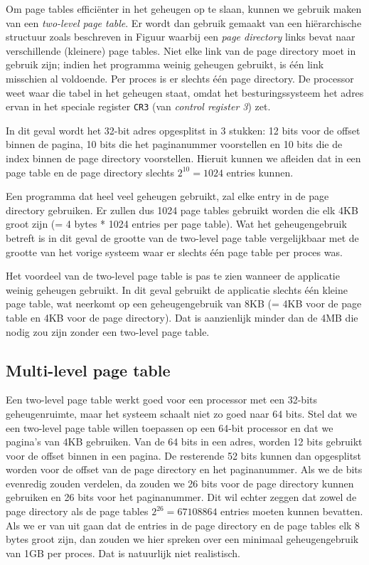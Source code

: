 Om page tables effici\"enter in het geheugen op te slaan, kunnen we gebruik maken van een \emph{two-level page table}. Er wordt dan gebruik gemaakt van een hi\"erarchische structuur zoals beschreven in Figuur  waarbij een \emph{page directory} links bevat naar verschillende (kleinere) page tables. Niet elke link van de page directory moet in gebruik zijn; indien het programma weinig geheugen gebruikt, is \'e\'en link misschien al voldoende. Per proces is er slechts \'e\'en page directory. De processor weet waar die tabel in het geheugen staat, omdat het besturingssysteem het adres ervan in het speciale register \texttt{CR3} (van \emph{control register 3}) zet.

In dit geval wordt het 32-bit adres opgesplitst in 3 stukken: 12 bits voor de offset binnen de pagina, 10 bits die het paginanummer voorstellen en 10 bits die de index binnen de page directory voorstellen. Hieruit kunnen we afleiden dat in een page table en de page directory slechts $2^{10} = 1024$ entries kunnen.


Een programma dat heel veel geheugen gebruikt, zal elke entry in de page directory gebruiken. Er zullen dus 1024 page tables gebruikt worden die elk 4KB groot zijn (= 4 bytes * 1024 entries per page table). Wat het geheugengebruik betreft is in dit geval de grootte van de two-level page table vergelijkbaar met de grootte van het vorige systeem waar er slechts \'e\'en page table per proces was.

Het voordeel van de two-level page table is pas te zien wanneer de applicatie weinig geheugen gebruikt. In dit geval gebruikt de applicatie slechts \'e\'en kleine page table, wat neerkomt op een geheugengebruik van 8KB (= 4KB voor de page table en 4KB voor de page directory). Dat is aanzienlijk minder dan de 4MB die nodig zou zijn zonder een two-level page table.

\subsection{Multi-level page table}\label{multi-level-page-table}

Een two-level page table werkt goed voor een processor met een 32-bits geheugenruimte, maar het systeem schaalt niet zo goed naar 64 bits. Stel dat we een two-level page table willen toepassen op een 64-bit processor en dat we pagina's van 4KB gebruiken. Van de 64 bits in een adres, worden 12 bits gebruikt voor de offset binnen in een pagina. De resterende 52 bits kunnen dan opgesplitst worden voor de offset van de page directory en het paginanummer. Als we de bits evenredig zouden verdelen, da zouden we 26 bits voor de page directory kunnen gebruiken en 26 bits voor het paginanummer. Dit wil echter zeggen dat zowel de page directory als de page tables $2^{26} = 67108864$ entries moeten kunnen bevatten. Als we er van uit gaan dat de entries in de page directory en de page tables elk 8 bytes groot zijn, dan zouden we hier spreken over een minimaal geheugengebruik van 1GB per proces. Dat is natuurlijk niet realistisch.

